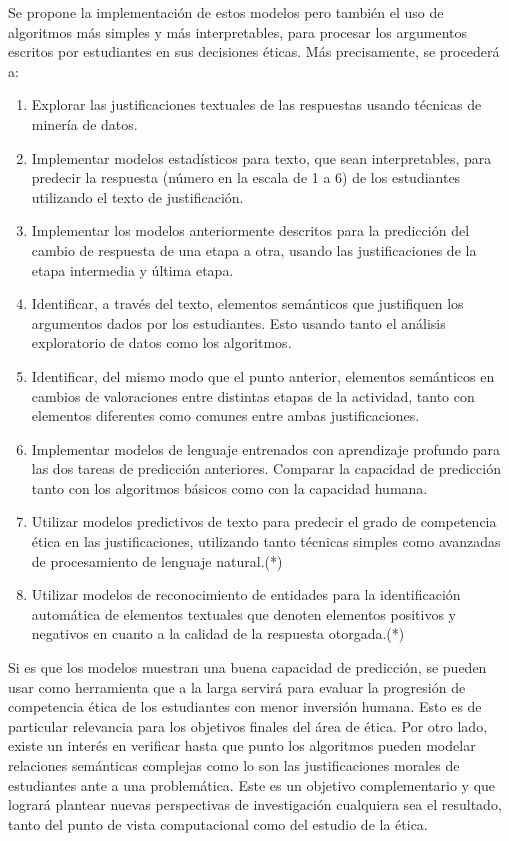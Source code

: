 \documentclass[
	spanish, %
	letterpaper, oneside
]{article}
\begin{document}
\newp Se propone la implementación de estos modelos pero también el uso de algoritmos más simples y más interpretables, para procesar los argumentos escritos por estudiantes en sus decisiones éticas. Más precisamente, se procederá a:

\begin{enumerate}
    \item Explorar las justificaciones textuales de las respuestas usando técnicas de minería de datos.

    \item Implementar modelos estadísticos para texto, que sean interpretables, para predecir la respuesta (número en la escala de 1 a 6) de los estudiantes utilizando el texto de justificación.

    \item Implementar los modelos anteriormente descritos para la predicción del cambio de respuesta de una etapa a otra, usando las justificaciones de la etapa intermedia y última etapa.
    
    \item Identificar, a través del texto, elementos semánticos que justifiquen los argumentos dados por los estudiantes. Esto usando tanto el análisis exploratorio de datos como los algoritmos.
    
    \item Identificar, del mismo modo que el punto anterior, elementos semánticos en cambios de valoraciones entre distintas etapas de la actividad, tanto con elementos diferentes como comunes entre ambas justificaciones.

    \item Implementar modelos de lenguaje entrenados con aprendizaje profundo para las dos tareas de predicción anteriores. Comparar la capacidad de predicción tanto con los algoritmos básicos como con la capacidad humana.
    
    \item Utilizar modelos predictivos de texto para predecir el grado de competencia ética en las justificaciones, utilizando tanto técnicas simples como avanzadas de procesamiento de lenguaje natural.(*)

    \item Utilizar modelos de reconocimiento de entidades para la identificación automática de elementos textuales que denoten elementos positivos y negativos en cuanto a la calidad de la respuesta otorgada.(*)
\end{enumerate}

Si es que los modelos muestran una buena capacidad de predicción, se pueden usar como herramienta que a la larga servirá para evaluar la progresión de competencia ética de los estudiantes con menor inversión humana. Esto es de particular relevancia para los objetivos finales del área de ética. Por otro lado, existe un interés en verificar hasta que punto los algoritmos pueden modelar relaciones semánticas complejas como lo son las justificaciones morales de estudiantes ante a una problemática. Este es un objetivo complementario y que logrará plantear nuevas perspectivas de investigación cualquiera sea el resultado, tanto del punto de vista computacional como del estudio de la ética.
\end{document}

